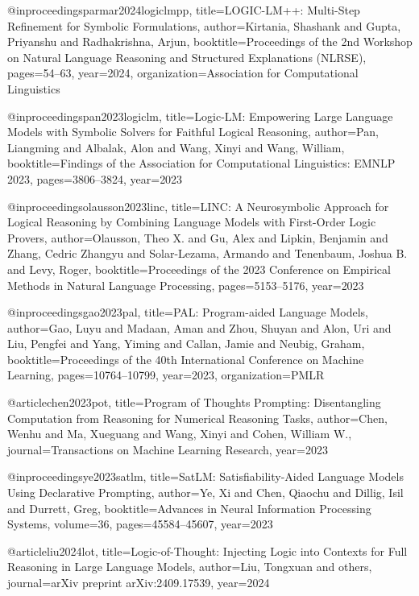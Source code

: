 @inproceedings{parmar2024logiclmpp,
  title={{LOGIC-LM++}: Multi-Step Refinement for Symbolic Formulations},
  author={Kirtania, Shashank and Gupta, Priyanshu and Radhakrishna, Arjun},
  booktitle={Proceedings of the 2nd Workshop on Natural Language Reasoning and Structured Explanations (NLRSE)},
  pages={54--63},
  year={2024},
  organization={Association for Computational Linguistics}
}

@inproceedings{pan2023logiclm,
  title={{Logic-LM}: Empowering Large Language Models with Symbolic Solvers for Faithful Logical Reasoning},
  author={Pan, Liangming and Albalak, Alon and Wang, Xinyi and Wang, William},
  booktitle={Findings of the Association for Computational Linguistics: EMNLP 2023},
  pages={3806--3824},
  year={2023}
}

@inproceedings{olausson2023linc,
  title={{LINC}: A Neurosymbolic Approach for Logical Reasoning by Combining Language Models with First-Order Logic Provers},
  author={Olausson, Theo X. and Gu, Alex and Lipkin, Benjamin and Zhang, Cedric Zhangyu and Solar-Lezama, Armando and Tenenbaum, Joshua B. and Levy, Roger},
  booktitle={Proceedings of the 2023 Conference on Empirical Methods in Natural Language Processing},
  pages={5153--5176},
  year={2023}
}


@inproceedings{gao2023pal,
  title={{PAL}: Program-aided Language Models},
  author={Gao, Luyu and Madaan, Aman and Zhou, Shuyan and Alon, Uri and Liu, Pengfei and Yang, Yiming and Callan, Jamie and Neubig, Graham},
  booktitle={Proceedings of the 40th International Conference on Machine Learning},
  pages={10764--10799},
  year={2023},
  organization={PMLR}
}

@article{chen2023pot,
  title={Program of Thoughts Prompting: Disentangling Computation from Reasoning for Numerical Reasoning Tasks},
  author={Chen, Wenhu and Ma, Xueguang and Wang, Xinyi and Cohen, William W.},
  journal={Transactions on Machine Learning Research},
  year={2023}
}

@inproceedings{ye2023satlm,
  title={{SatLM}: Satisfiability-Aided Language Models Using Declarative Prompting},
  author={Ye, Xi and Chen, Qiaochu and Dillig, Isil and Durrett, Greg},
  booktitle={Advances in Neural Information Processing Systems},
  volume={36},
  pages={45584--45607},
  year={2023}
}

@article{liu2024lot,
  title={Logic-of-Thought: Injecting Logic into Contexts for Full Reasoning in Large Language Models},
  author={Liu, Tongxuan and others},
  journal={arXiv preprint arXiv:2409.17539},
  year={2024}
}

